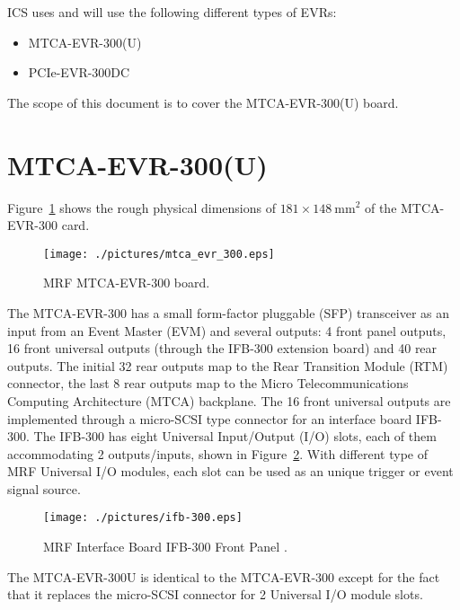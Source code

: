 \documentclass[11pt
  , a4paper
  , article
  , oneside
  , showtrims
]{memoir}
\begin{document}
ICS uses and will use the following different types of EVRs:
\begin{itemize}
\item MTCA-EVR-300(U)
\item PCIe-EVR-300DC
\end{itemize}

The scope of this document is to cover the MTCA-EVR-300(U) board.\\


\section{MTCA-EVR-300(U)}
Figure~\ref{fig:mtca-evr300} shows the rough physical dimensions of $181\times 148~\mathrm{mm}{}^2$ of the MTCA-EVR-300 card.

\begin{figure}[!htb]
  \centering
  \texttt{[image: ./pictures/mtca\_evr\_300.eps]}
  \caption{
    MRF MTCA-EVR-300 board.
  }
  \label{fig:mtca-evr300}
\end{figure}


The MTCA-EVR-300  has a small form-factor pluggable (SFP) transceiver as an input from an Event Master (EVM) and several outputs: 4 front panel outputs, 16 front universal outputs (through the IFB-300 extension board) and 40 rear outputs. The initial 32 rear outputs map to the Rear Transition Module (RTM) connector, the last 8 rear outputs map to the Micro Telecommunications Computing Architecture (MTCA) backplane. The 16 front universal outputs are implemented through a micro-SCSI type connector for an interface board IFB-300. The IFB-300 has eight Universal Input/Output (I/O) slots, each of them accommodating 2 outputs/inputs, shown in Figure~\ref{fig:ifb-300}. With different type of MRF Universal I/O modules, each slot can be used as an unique trigger or event signal source.\\

\begin{figure}[!htb]
  \centering
  \texttt{[image: ./pictures/ifb-300.eps]}
  \caption{
    MRF Interface Board IFB-300 Front Panel \cite{MRFEVENTSYSTEMDC}.
  }
  \label{fig:ifb-300}
\end{figure}

The MTCA-EVR-300U is identical to the MTCA-EVR-300 except for the fact that it replaces the micro-SCSI connector for 2 Universal I/O module slots.\\
\end{document}
